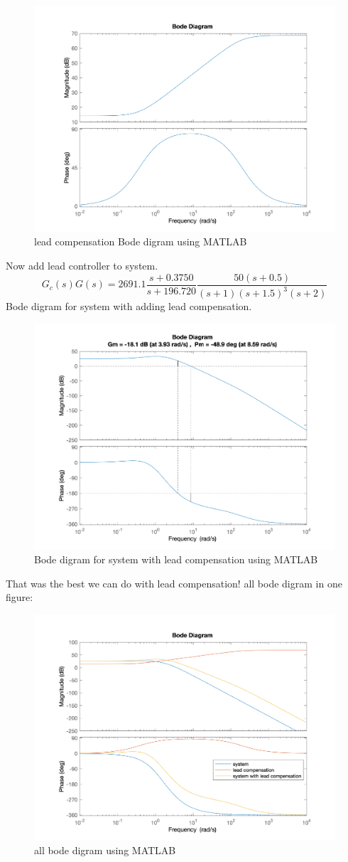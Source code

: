 \begin{figure}[H]
	\caption{lead compensation Bode digram using MATLAB}
	\centering
	\includegraphics[width=12cm]{../Figure/Q1/a/controller_bode.png}
\end{figure}
Now add lead controller to system.
$$
G_c(s)G(s) = 2691.1\dfrac{s + 0.3750}{s + 196.720} \dfrac{50(s+0.5)}{(s+1)(s+1.5)^{3}(s+2)}
$$
Bode digram for system with adding lead compensation.
\begin{figure}[H]
	\caption{Bode digram for system with lead compensation using MATLAB}
	\centering
	\includegraphics[width=12cm]{../Figure/Q1/a/new_margin.png}
\end{figure}
That was the best we can do with lead compensation!
all bode digram in one figure:
\begin{figure}[H]
	\caption{all bode digram using MATLAB}
	\centering
	\includegraphics[width=12cm]{../Figure/Q1/a/all_in_one.png}
\end{figure}
